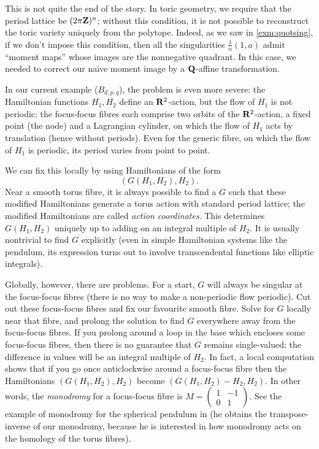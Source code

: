 \documentclass{article}
\begin{document}
This is not quite the end of the story. In toric geometry, we require
that the period lattice be \((2\pi\mathbf{Z})^n\); without this condition, it
is not possible to reconstruct the toric variety uniquely from the
polytope. Indeed, as we saw in \cref{exm:quotsing}, if we don't impose
this condition, then all the singularities \(\frac{1}{n}(1,a)\) admit
``moment maps'' whose images are the nonnegative quadrant. In this
case, we needed to correct our naive moment image by a \(\mathbf{Q}\)-affine
transformation.


In our current example (\(B_{d,p,q}\)), the problem is even more
severe: the Hamiltonian functions \(H_1,H_2\) define an
\(\mathbf{R}^2\)-action, but the flow of \(H_1\) is not periodic: the
focus-focus fibres each comprise two orbits of the \(\mathbf{R}^2\)-action, a
fixed point (the node) and a Lagrangian cylinder, on which the flow of
\(H_1\) acts by translation (hence without periods). Even for the
generic fibre, on which the flow of \(H_1\) is periodic, its period
varies from point to point.


We can fix this locally by using Hamiltonians of the form
\[(G(H_1,H_2),H_2).\] Near a smooth torus fibre, it is always possible
to find a \(G\) such that these modified Hamiltonians generate a torus
action with standard period lattice; the modified Hamiltonians are
called {\em action coordinates}. This determines \(G(H_1,H_2)\)
uniquely up to adding on an integral multiple of \(H_2\). It is
usually nontrivial to find \(G\) explicitly (even in simple
Hamiltonian systems like the pendulum, its expression turns out to
involve transcendental functions like elliptic integrals).


Globally, however, there are problems. For a start, \(G\) will always
be singular at the focus-focus fibres (there is no way to make a
non-periodic flow periodic). Cut out these focus-focus fibres and fix
our favourite smooth fibre. Solve for \(G\) locally near that fibre,
and prolong the solution to find \(G\) everywhere away from the
focus-focus fibres. If you prolong around a loop in the base which
encloses some focus-focus fibres, then there is no guarantee that
\(G\) remains single-valued; the difference in values will be an
integral multiple of \(H_2\). In fact, a local computation shows that
if you go once anticlockwise around a focus-focus fibre then the
Hamiltonians \((G(H_1,H_2),H_2)\) become \((G(H_1,H_2)-H_2,H_2)\). In
other words, the {\em monodromy} for a focus-focus fibre is
\(M=\begin{pmatrix} 1 & -1 \\ 0 & 1\end{pmatrix}\). See the example of
monodromy for the spherical pendulum in \cite{Duistermaat} (he obtains
the transpose-inverse of our monodromy, because he is interested in
how monodromy acts on the homology of the torus fibres).
\end{document}
